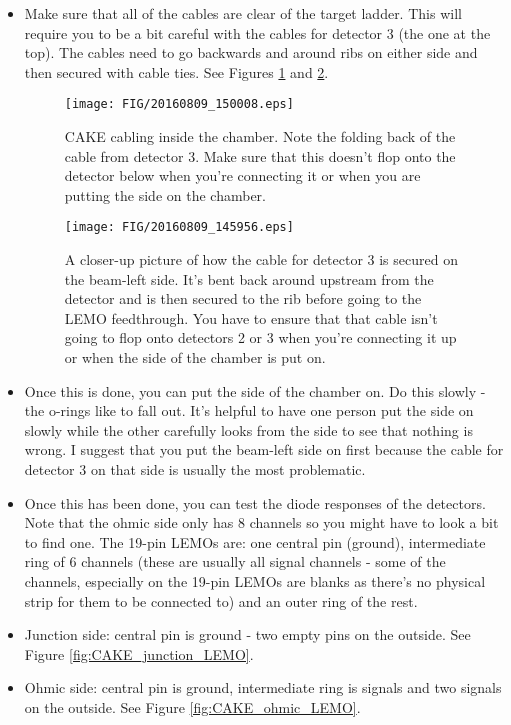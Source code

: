 \documentclass[11pt]{report}
\begin{document}
\begin{itemize}
\item Make sure that all of the cables are clear of the target ladder. This will require you to be a bit careful with the cables for detector 3 (the one at the top). The cables need to go backwards and around ribs on either side and then secured with cable ties. See Figures \ref{fig:CAKE_cables_in_chamber} and \ref{fig:CAKE_detector3_cable}.

\begin{figure}
 \texttt{[image: FIG/20160809\_150008.eps]}
 \caption{CAKE cabling inside the chamber. Note the folding back of the cable from detector 3. Make sure that this doesn't flop onto the detector below when you're connecting it or when you are putting the side on the chamber.}
 \label{fig:CAKE_cables_in_chamber}
\end{figure}

\begin{figure}
 \texttt{[image: FIG/20160809\_145956.eps]}
 \caption{A closer-up picture of how the cable for detector 3 is secured on the beam-left side. It's bent back around upstream from the detector and is then secured to the rib before going to the LEMO feedthrough. You have to ensure that that cable isn't going to flop onto detectors 2 or 3 when you're connecting it up or when the side of the chamber is put on.}
 \label{fig:CAKE_detector3_cable}
\end{figure}


\item Once this is done, you can put the side of the chamber on. Do this slowly - the o-rings like to fall out. It’s helpful to have one person put the side on slowly while the other carefully looks from the side to see that nothing is wrong. I suggest that you put the beam-left side on first because the cable for detector 3 on that side is usually the most problematic.

\item Once this has been done, you can test the diode responses of the detectors. Note that the ohmic side only has 8 channels so you might have to look a bit to find one. The 19-pin LEMOs are: one central pin (ground), intermediate ring of 6 channels (these are usually all signal channels - some of the channels, especially on the 19-pin LEMOs are blanks as there's no physical strip for them to be connected to) and an outer ring of the rest.

\item Junction side: central pin is ground - two empty pins on the outside. See Figure \ref{fig:CAKE_junction_LEMO}.
\item Ohmic side: central pin is ground, intermediate ring is signals and two signals on the outside. See Figure \ref{fig:CAKE_ohmic_LEMO}.


\end{itemize}
\end{document}
